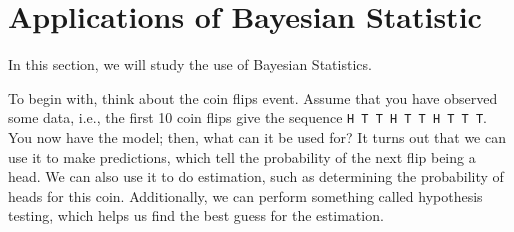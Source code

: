 \section{Applications of Bayesian Statistic}
In this section, we will study the use of Bayesian Statistics.

To begin with, think about the coin flips event. Assume that you have observed some data, i.e., the first 10 coin flips give the sequence \verb|H T T H T T H T T T|. You now have the model; then, what can it be used for? It turns out that we can use it to make predictions, which tell the probability of the next flip being a head. We can also use it to do estimation, such as determining the probability of heads for this coin. Additionally, we can perform something called hypothesis testing, which helps us find the best guess for the estimation.

